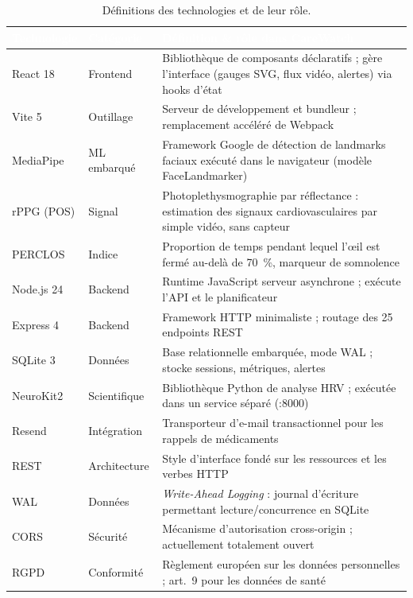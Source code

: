 \documentclass[11pt,a4paper]{article}
\begin{document}
\begin{table}[H]
\centering\small
\begin{tabularx}{\linewidth}{>{\raggedright\arraybackslash}p{2.7cm} >{\raggedright\arraybackslash}p{2.5cm} >{\raggedright\arraybackslash}X}
\toprule
\rowcolor{cwblue} \textcolor{white}{\bf Technologie} & \textcolor{white}{\bf Catégorie} & \textcolor{white}{\bf Définition
\& rôle dans CareWatch} \\
\midrule
React 18 & Frontend & Bibliothèque de composants déclaratifs ; gère l'interface (gauges SVG, flux
 vidéo, alertes) via hooks d'état \\
Vite 5 & Outillage & Serveur de développement et bundleur ; remplacement accéléré de Webpack \\
MediaPipe & ML embarqué & Framework Google de détection de landmarks faciaux exécuté dans le
 navigateur (modèle FaceLandmarker) \\
rPPG (POS) & Signal & Photoplethysmographie par réflectance : estimation des signaux cardiovasculaires
 par simple vidéo, sans capteur \\
PERCLOS & Indice & Proportion de temps pendant lequel l'œil est fermé au-delà de 70~\%, marqueur de
 somnolence \cite{dinges1998} \\
Node.js 24 & Backend & Runtime JavaScript serveur asynchrone ; exécute l'API et le planificateur \\
Express 4 & Backend & Framework HTTP minimaliste ; routage des 25 endpoints REST \\
SQLite 3 & Données & Base relationnelle embarquée, mode WAL ; stocke sessions, métriques, alertes \\
NeuroKit2 & Scientifique & Bibliothèque Python de analyse HRV ; exécutée dans un service séparé
 (:8000) \\
Resend & Intégration & Transporteur d'e-mail transactionnel pour les rappels de médicaments \\
REST & Architecture & Style d'interface fondé sur les ressources et les verbes HTTP \\
WAL & Données & \textit{Write-Ahead Logging} : journal d'écriture permettant lecture/concurrence en
 SQLite \\
CORS & Sécurité & Mécanisme d'autorisation cross-origin ; actuellement totalement ouvert \\
RGPD & Conformité & Règlement européen sur les données personnelles ; art.~9 pour les données de
 santé \\
\bottomrule
\end{tabularx}
\caption{Définitions des technologies et de leur rôle.}
\label{tab:tech}
\end{table}
\end{document}

